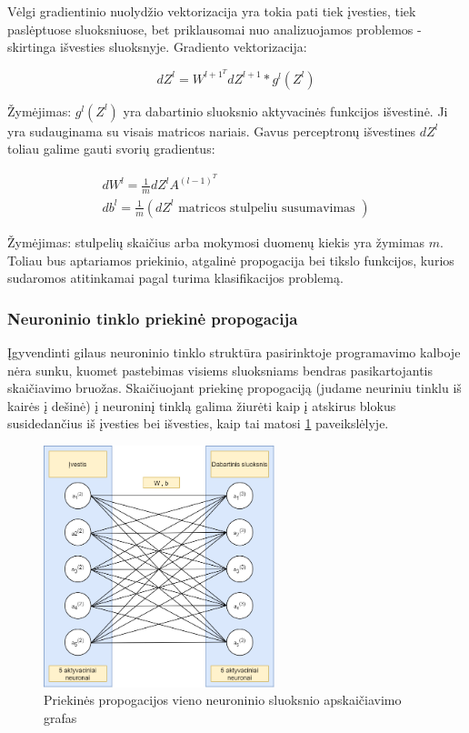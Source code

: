 \documentclass[a4paper, 12pt]{article}
\begin{document}
Vėlgi gradientinio nuolydžio vektorizacija yra tokia pati tiek įvesties, tiek paslėptuose sluoksniuose, bet priklausomai nuo analizuojamos problemos - skirtinga išvesties sluoksnyje. Gradiento vektorizacija:

\begin{equation}
\label{eqn:backpropdz}
d Z^{l}=W^{l+1^{T}} d Z^{l+1} * g^{l}\left(Z^{l}\right)
\end{equation}

Žymėjimas: $g^l(Z^l)$ yra dabartinio sluoksnio aktyvacinės funkcijos išvestinė. Ji yra sudauginama su visais matricos nariais. Gavus perceptronų išvestines $dZ^l$ toliau galime gauti svorių gradientus:


\begin{equation}
\label{eqn:backprop}
\begin{gathered}
d W^{l}=\frac{1}{m} d Z^{l} A^{(l-1)^{T}} \\
d b^{l}=\frac{1}{m}\left(d Z^{l} \text { matricos stulpeliu susumavimas }\right)
\end{gathered}
\end{equation}



Žymėjimas: stulpelių skaičius arba mokymosi duomenų kiekis yra žymimas $m$. Toliau bus aptariamos priekinio, atgalinė propogacija bei tikslo funkcijos, kurios sudaromos atitinkamai pagal turima klasifikacijos problemą.

%
\subsubsection{Neuroninio tinklo priekinė propogacija}
%

Įgyvendinti gilaus neuroninio tinklo struktūra pasirinktoje programavimo kalboje nėra sunku, kuomet pastebimas visiems sluoksniams bendras pasikartojantis skaičiavimo bruožas. Skaičiuojant priekinę propogaciją (judame neuriniu tinklu iš kairės į dešinė) į neuroninį tinklą galima žiurėti kaip į atskirus blokus susidedančius iš įvesties bei išvesties, kaip tai matosi \ref{forwardProp} paveikslėlyje.
\clearpage
\begin{figure}[h]
\centering
\includegraphics[width=0.6\textwidth]{ForwardProp}
\caption{Priekinės propogacijos vieno neuroninio sluoksnio apskaičiavimo grafas}
\label{forwardProp}
\end{figure}
\end{document}
